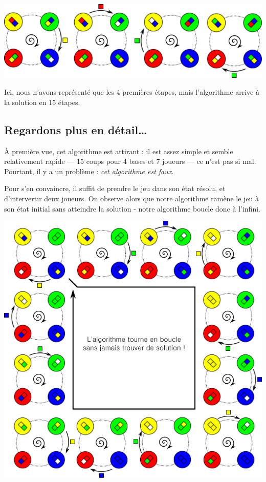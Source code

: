 \documentclass[a5paper,pagesize,DIV=14]{scrbook}
\begin{document}
\begin{center}
  \includegraphics[width=\linewidth]{baseball/baseball_ex1.pdf}
\end{center}

Ici, nous n'avons représenté que les 4 premières étapes, mais l'algorithme
arrive à la solution en 15 étapes.

\subsection*{Regardons plus en détail{\ldots}}

À première vue, cet algorithme est attirant : il est assez simple et semble
relativement rapide --- 15 coups pour 4 bases et 7 joueurs --- ce n'est pas si
mal. Pourtant, il y a un problème : \textit{cet algorithme est faux}.

Pour s'en convaincre, il suffit de prendre le jeu dans son état résolu, et
d'intervertir deux joueurs. On observe alors que notre algorithme ramène le jeu
à son état initial sans atteindre la solution - notre algorithme boucle donc à
l'infini.

\begin{center}
  \includegraphics[width=\linewidth]{baseball/baseball_ex2.pdf}
\end{center}
\end{document}
